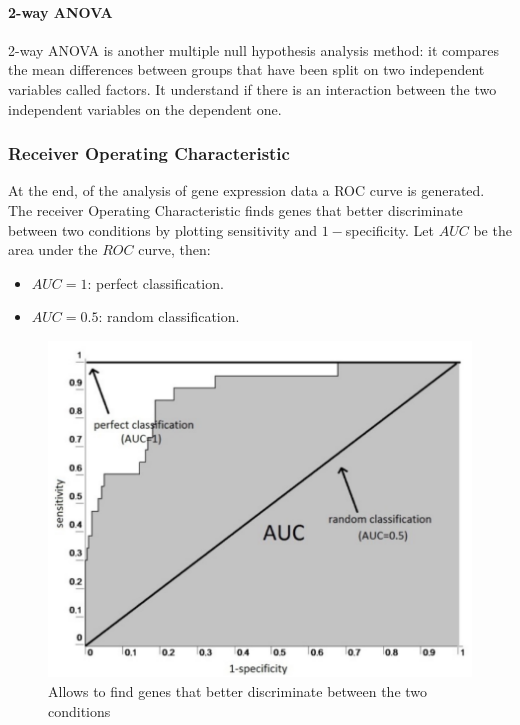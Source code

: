 			\paragraph{2-way ANOVA}
			2-way ANOVA is another multiple null hypothesis analysis method: it compares the mean differences between groups that have been split on two independent variables called factors.
			It understand if there is an interaction between the two independent variables on the dependent one.


		\subsubsection{Receiver Operating Characteristic}
		At the end, of the analysis of gene expression data a ROC curve is generated.
		The receiver Operating Characteristic finds genes that better discriminate between two conditions by plotting sensitivity and $1-$specificity.
		Let $AUC$ be the area under the $ROC$ curve, then:

		\begin{multicols}{2}
			\begin{itemize}
				\item $AUC=1$: perfect classification.
				\item $AUC = 0.5$: random classification.
			\end{itemize}
		\end{multicols}
		
		\begin{figure}
	\centering
	\includegraphics[scale=0.2]{ROC}
	\caption{Allows to find genes that better discriminate between the two conditions}
	\label{fig:design}
\end{figure}

